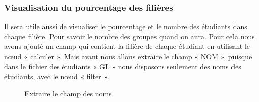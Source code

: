 \documentclass{article}
\begin{document}
            \subsubsection{Visualisation du pourcentage des filières}
            Il sera utile aussi de visualiser le pourcentage et le nombre des étudiants dans chaque filière. Pour savoir le nombre des groupes quand on aura. Pour cela nous avons ajouté un champ qui contient la filière de chaque étudiant en utilisant le nœud « calculer ». Mais avant nous allons extraire le champ « NOM », puisque dans le fichier des étudiants « GL » nous disposons seulement des noms des étudiants, avec le nœud « filter ».\par
            \begin{figure}[h!]
                \centering
                \caption{Extraire le champ des noms}
                \label{fig:7}
            \end{figure}
\end{document}
